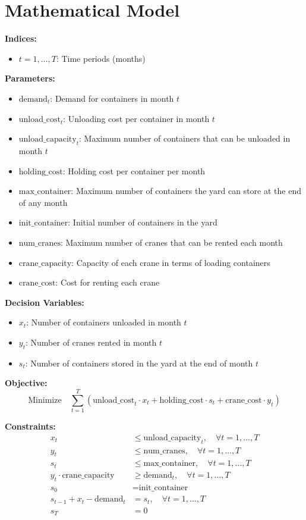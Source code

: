 \documentclass{article}
\begin{document}
\section*{Mathematical Model}

\textbf{Indices:}
\begin{itemize}
    \item $t = 1, \ldots, T$: Time periods (months)
\end{itemize}

\textbf{Parameters:}
\begin{itemize}
    \item $\text{demand}_t$: Demand for containers in month $t$
    \item $\text{unload\_cost}_t$: Unloading cost per container in month $t$
    \item $\text{unload\_capacity}_t$: Maximum number of containers that can be unloaded in month $t$
    \item $\text{holding\_cost}$: Holding cost per container per month
    \item $\text{max\_container}$: Maximum number of containers the yard can store at the end of any month
    \item $\text{init\_container}$: Initial number of containers in the yard
    \item $\text{num\_cranes}$: Maximum number of cranes that can be rented each month
    \item $\text{crane\_capacity}$: Capacity of each crane in terms of loading containers
    \item $\text{crane\_cost}$: Cost for renting each crane
\end{itemize}

\textbf{Decision Variables:}
\begin{itemize}
    \item $x_t$: Number of containers unloaded in month $t$
    \item $y_t$: Number of cranes rented in month $t$
    \item $s_t$: Number of containers stored in the yard at the end of month $t$
\end{itemize}

\textbf{Objective:}
\[
\text{Minimize} \quad \sum_{t=1}^{T} \left( \text{unload\_cost}_t \cdot x_t + \text{holding\_cost} \cdot s_t + \text{crane\_cost} \cdot y_t \right)
\]

\textbf{Constraints:}
\begin{align}
    x_t &\leq \text{unload\_capacity}_t, \quad \forall t = 1, \ldots, T \\
    y_t &\leq \text{num\_cranes}, \quad \forall t = 1, \ldots, T \\
    s_t &\leq \text{max\_container}, \quad \forall t = 1, \ldots, T \\
    y_t \cdot \text{crane\_capacity} &\geq \text{demand}_t, \quad \forall t = 1, \ldots, T \\
    s_0 &= \text{init\_container} \\
    s_{t-1} + x_t - \text{demand}_t &= s_t, \quad \forall t = 1, \ldots, T \\
    s_T &= 0
\end{align}
\end{document}
